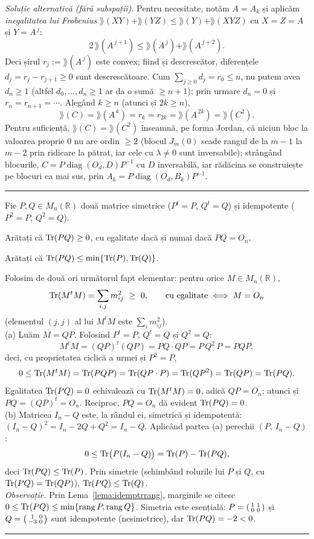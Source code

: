 \emph{Soluție alternativă (fără subspații).} Pentru necesitate, notăm $A=A_k$ și aplicăm \emph{inegalitatea lui Frobenius} $\rang(XY)+\rang(YZ)\le\rang(Y)+\rang(XYZ)$ cu $X=Z=A$ și $Y=A^{\,j}$:
\[ 2\,\rang(A^{\,j+1})\le\rang(A^{\,j})+\rang(A^{\,j+2}). \]
Deci șirul $r_j:=\rang(A^{\,j})$ este convex; fiind și descrescător, diferențele $d_j=r_j-r_{j+1}\ge0$ sunt descrescătoare. Cum $\sum_{j\ge0}d_j=r_0\le n$, nu putem avea $d_n\ge1$ (altfel $d_0,\dots,d_n\ge1$ ar da o sumă $\ge n+1$); prin urmare $d_n=0$ și $r_n=r_{n+1}=\cdots$. Alegând $k\ge n$ (atunci și $2k\ge n$),
\[ \rang(C)=\rang(A^{\,k})=r_k=r_{2k}=\rang(A^{\,2k})=\rang(C^2). \]
Pentru suficiență, $\rang(C)=\rang(C^2)$ înseamnă, pe forma Jordan, că niciun bloc la valoarea proprie $0$ nu are ordin $\ge2$ (blocul $J_m(0)$ scade rangul de la $m-1$ la $m-2$ prin ridicare la pătrat, iar cele cu $\lambda\neq0$ sunt inversabile); strângând blocurile, $C=P\operatorname{diag}(O_d,D)P^{-1}$ cu $D$ inversabilă, iar rădăcina se construiește pe blocuri ca mai sus, prin $A_k=P\operatorname{diag}(O_d,B_k)P^{-1}$.
\vspace{1mm}\hrule

Fie $P,Q\in M_n(\mathbb{R})$ două matrice simetrice ($P^t=P$, $Q^t=Q$) și idempotente ($P^2=P$, $Q^2=Q$).
\begin{parti}
  \item Arătați că $\operatorname{Tr}(PQ)\ge0$, cu egalitate dacă și numai dacă $PQ=O_n$.
  \item Arătați că $\operatorname{Tr}(PQ)\le\min\{\operatorname{Tr}(P),\operatorname{Tr}(Q)\}$.
\end{parti}
\sol Folosim de două ori următorul fapt elementar: pentru orice $M\in M_n(\mathbb{R})$,
\[ \Tr(M^tM)=\sum_{i,j}m_{ij}^2\ \ge\ 0,\qquad\text{cu egalitate}\iff M=O_n \]
(elementul $(j,j)$ al lui $M^tM$ este $\sum_i m_{ij}^2$).\\[2pt]
(a) Luăm $M=QP$. Folosind $P^t=P$, $Q^t=Q$ și $Q^2=Q$:
\[ M^tM=(QP)^t(QP)=PQ\cdot QP=P\,Q^2\,P=PQP, \]
deci, cu proprietatea ciclică a urmei și $P^2=P$,
\[ 0\le\operatorname{Tr}(M^tM)=\operatorname{Tr}(PQP)=\operatorname{Tr}(QP\cdot P)=\operatorname{Tr}(QP^2)=\operatorname{Tr}(QP)=\operatorname{Tr}(PQ). \]
Egalitatea $\operatorname{Tr}(PQ)=0$ echivalează cu $\operatorname{Tr}(M^tM)=0$, adică $QP=O_n$; atunci și $PQ=(QP)^t=O_n$. Reciproc, $PQ=O_n$ dă evident $\operatorname{Tr}(PQ)=0$.\\[2pt]
(b) Matricea $I_n-Q$ este, la rândul ei, simetrică și idempotentă: $(I_n-Q)^2=I_n-2Q+Q^2=I_n-Q$. Aplicând partea (a) perechii $(P,\,I_n-Q)$:
\[ 0\le\operatorname{Tr}\bigl(P(I_n-Q)\bigr)=\operatorname{Tr}(P)-\operatorname{Tr}(PQ), \]
deci $\operatorname{Tr}(PQ)\le\operatorname{Tr}(P)$. Prin simetrie (schimbând rolurile lui $P$ și $Q$, cu $\operatorname{Tr}(PQ)=\operatorname{Tr}(QP)$), $\operatorname{Tr}(PQ)\le\operatorname{Tr}(Q)$.\\[2pt]
\emph{Observație.} Prin Lema~\ref{lema:idemptrrang}, marginile se citesc $0\le\operatorname{Tr}(PQ)\le\min\{\operatorname{rang} P,\operatorname{rang} Q\}$. Simetria este esențială: $P=\begin{psmallmatrix}1&1\\0&0\end{psmallmatrix}$ și $Q=\begin{psmallmatrix}1&0\\-3&0\end{psmallmatrix}$ sunt idempotente (nesimetrice), dar $\operatorname{Tr}(PQ)=-2<0$.
\vspace{1mm}\hrule

